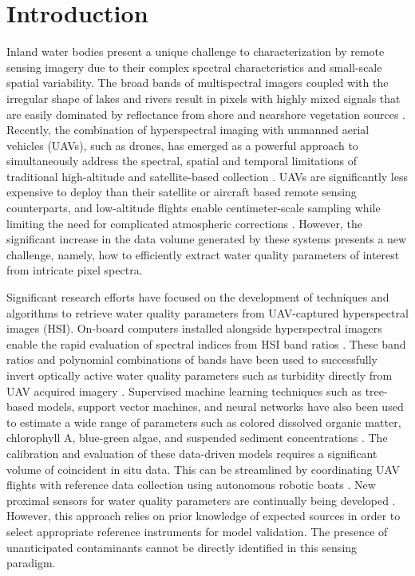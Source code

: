 \documentclass[remotesensing,article,submit,pdftex,moreauthors]{Definitions/mdpi}
\begin{document}
\section{Introduction}\label{introduction}

Inland water bodies present a unique challenge to characterization by remote sensing imagery due to their complex spectral characteristics and small-scale spatial variability. The broad bands of multispectral imagers coupled with the irregular shape of lakes and rivers result in pixels with highly mixed signals that are easily dominated by reflectance from shore and nearshore vegetation sources \cite{koponen2002lake, ritchie2003remote}. Recently, the combination of hyperspectral imaging with unmanned aerial vehicles (UAVs), such as drones, has emerged as a powerful approach to simultaneously address the spectral, spatial and temporal limitations of traditional high-altitude and satellite-based collection \cite{adao2017hyperspectral,arroyo2019implementation}. UAVs are significantly less expensive to deploy than their satellite or aircraft based remote sensing counterparts, and low-altitude flights enable centimeter-scale sampling while limiting the need for complicated atmospheric corrections \cite{banerjee2020uav}. However, the significant increase in the data volume generated by these systems presents a new challenge, namely, how to efficiently extract water quality parameters of interest from intricate pixel spectra.

Significant research efforts have focused on the development of techniques and algorithms to retrieve water quality parameters from UAV-captured hyperspectral images (HSI). On-board computers installed alongside hyperspectral imagers enable the rapid evaluation of spectral indices from HSI band ratios \cite{horstrand2019uav}. These band ratios and polynomial combinations of bands have been used to successfully invert optically active water quality parameters such as turbidity directly from UAV acquired imagery \cite{vogt2016near, zhang2022selection}. Supervised machine learning techniques such as tree-based models, support vector machines, and neural networks have also been used to estimate a wide range of parameters such as colored dissolved organic matter, chlorophyll A, blue-green algae, and suspended sediment concentrations \cite{keller2018hyperspectral, lu2021retrieval}. The calibration and evaluation of these data-driven models requires a significant volume of coincident in situ data. This can be streamlined by coordinating UAV flights with reference data collection using autonomous robotic boats \cite{robot-team-1, robot-team-2}. New proximal sensors for water quality parameters are continually being developed \cite{proximal-sensing-1, proximal-sensing-2}. However, this approach relies on prior knowledge of expected sources in order to select appropriate reference instruments for model validation. The presence of unanticipated contaminants cannot be directly identified in this sensing paradigm. 
\end{document}
